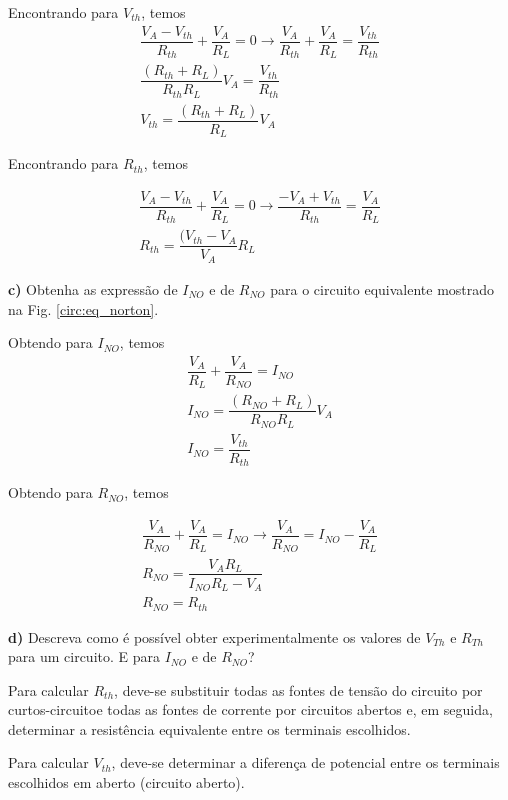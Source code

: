 Encontrando para $V_{th}$, temos
\begin{gather*}
  \dfrac{V_A - V_{th}}{R_{th}} + \dfrac{V_A}{R_L} = 0 \rightarrow \dfrac{V_A}{R_{th}} + \dfrac{V_A}{ R_L} = \dfrac{V_{th}}{R_{th}} \\
  \dfrac{(R_{th}+R_L)}{R_{th}R_L} V_A = \dfrac{V_{th}}{R_{th}} \\
  V_{th}=\dfrac{(R_{th}+R_L)}{R_L} V_A
\end{gather*}

Encontrando para $R_{th}$, temos

\begin{gather*}
  \dfrac{V_A-V_{th}}{R_{th}} + \dfrac{V_A}{R_L} = 0 \rightarrow \dfrac{-V_A + V_{th} }{R_{th}} =\dfrac{V_A}{R_L} \\
  R_{th}=\dfrac{(V_{th}-V_A}{V_A} R_L
\end{gather*}


\noindent \textbf{c)} Obtenha as expressão de $I_{NO}$ e de $R_{NO}$ para o circuito equivalente mostrado na Fig. \ref{circ:eq_norton}. 

Obtendo para $I_{NO}$, temos
\begin{gather*}
  \dfrac{V_A}{R_L} + \dfrac{V_A}{R_{NO}} = I_{NO}\\
  I_{NO}=\dfrac{(R_{NO}+R_L)}{R_{NO}R_L} V_A\\
  I_{NO} = \dfrac{V_{th}}{R_{th}} 
\end{gather*}

Obtendo para $R_{NO}$, temos

\begin{gather*}
  \dfrac{V_A}{R_{NO}} + \dfrac{V_A}{R_L} =I_{NO}
  \rightarrow
  \dfrac{V_A}{R_{NO}} =I_{NO}-\dfrac{V_A}{R_L} \\
  R_{NO}=\dfrac{V_AR_L}{I_{NO}R_L-V_A} \\
  R_{NO}=R_{th}
\end{gather*}



\noindent \textbf{d)} Descreva como é possível obter experimentalmente os valores de $V_{Th}$ e $R_{Th}$ para um circuito. E para $I_{NO}$ e de $R_{NO}$? 

Para calcular $R_{th}$, deve-se substituir todas as fontes de tensão do circuito por curtos-circuitoe todas as fontes de corrente por circuitos abertos e, em seguida, determinar a resistência equivalente entre os terminais escolhidos.

Para calcular $V_{th}$, deve-se determinar a diferença de potencial entre os terminais escolhidos em aberto (circuito aberto).

